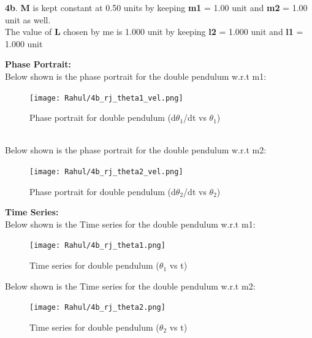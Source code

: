 \documentclass[11pt]{scrartcl} %
\begin{document}
\newpage
\textbf{4b}.
\textbf{M} is kept constant at 0.50 units by keeping \textbf{m1} = 1.00 unit and \textbf{m2} = 1.00 unit as well.\\

The value of \textbf{L} chosen by me is 1.000 unit by keeping \textbf{l2} = 1.000 unit and \textbf{l1} = 1.000 unit

\textbf{Phase Portrait:}\\
Below shown is the phase portrait for the double pendulum w.r.t m1:
\begin{figure}[h] %
	\centering
	\texttt{[image: Rahul/4b\_rj\_theta1\_vel.png]} %
	\caption{Phase portrait for double pendulum (d$\theta_{1}$/dt vs $\theta_{1}$)}
\end{figure}
\\
Below shown is the phase portrait for the double pendulum w.r.t m2:
\begin{figure}[h] %
	\centering
	\texttt{[image: Rahul/4b\_rj\_theta2\_vel.png]} %
	\caption{Phase portrait for double pendulum (d$\theta_{2}$/dt vs $\theta_{2}$)}
\end{figure}
\newpage
\textbf{Time Series:}\\
Below shown is the Time series for the double pendulum w.r.t m1:
\begin{figure}[h] %
	\centering
	\texttt{[image: Rahul/4b\_rj\_theta1.png]} %
	\caption{Time series for double pendulum ($\theta_{1}$ vs t)}
\end{figure}

Below shown is the Time series for the double pendulum w.r.t m2:
\begin{figure}[h] %
	\centering
	\texttt{[image: Rahul/4b\_rj\_theta2.png]} %
	\caption{Time series for double pendulum ($\theta_{2}$ vs t)}
\end{figure}
\end{document}
